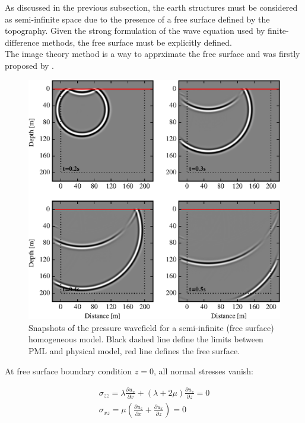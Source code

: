 \documentclass{gnulike}
\begin{document}
\noindent As discussed in the previous subsection, the earth structures must be considered as semi-infinite space due to the presence of a free surface defined by the topography. Given the strong formulation of the wave equation used by finite-difference methods, the free surface must be explicitly defined.\\

\noindent The image theory method is a way to apprximate the free surface and was firstly proposed by \cite{levander1988fourth}.

\begin{figure}[!ht]
  \centering
  \includegraphics[width=0.9\columnwidth]{fig/validation_snap_fsurf.eps}
  \caption{Snapshots of the pressure wavefield for a semi-infinite (free surface) homogeneous model. Black dashed line define the limits between PML and physical model, red line defines the free surface.}
\end{figure}

\noindent At free surface boundary condition $z=0$, all normal stresses vanish:

\begin{eqnarray}
  \sigma_{zz} = \lambda \frac{\partial u_{x}}{\partial x}+(\lambda+2\mu)\frac{\partial u_{z}}{\partial z} =0 \nonumber \\
  \sigma_{xz} = \mu \left( \frac{\partial u_{z}}{\partial x} + \frac{\partial u_{x}}{\partial z} \right) = 0
\end{eqnarray}
\end{document}

